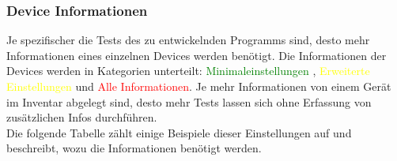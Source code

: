 \documentclass[
	ngerman,
	toc=listof, %
	toc=bibliography, %
	footnotes=multiple, %
	parskip=half, %
	numbers=noendperiod %
]{scrartcl}
\begin{document}
			\newpage

		\subsubsection{Device Informationen}
			Je spezifischer die Tests des zu entwickelnden Programms sind, desto mehr Informationen eines einzelnen Devices werden benötigt.
			Die Informationen der Devices werden in Kategorien unterteilt: \textcolor{green}{Minimaleinstellungen} , \textcolor{yellow}{Erweiterte Einstellungen} und \textcolor{red}{Alle Informationen}.
			Je mehr Informationen von einem Gerät im Inventar abgelegt sind, desto mehr Tests lassen sich ohne Erfassung von zusätzlichen Infos durchführen. \\
			Die folgende Tabelle zählt einige Beispiele dieser Einstellungen auf und beschreibt, wozu die Informationen benötigt werden.
\end{document}
